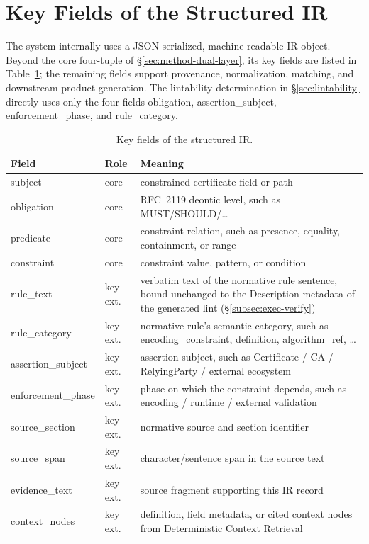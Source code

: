 \section{Key Fields of the Structured IR}
\label{app:ir}

The system internally uses a JSON-serialized, machine-readable IR object.
Beyond the core four-tuple of \S\ref{sec:method-dual-layer}, its key fields are listed in Table~\ref{tab:irfields};
the remaining fields support provenance, normalization, matching, and downstream
product generation. The lintability determination in \S\ref{sec:lintability} directly
uses only the four fields obligation, assertion\_subject, enforcement\_phase, and
rule\_category.

\begin{table}[tb]
\centering
\footnotesize
\caption{Key fields of the structured IR.}
\label{tab:irfields}
\begin{tabularx}{\columnwidth}{@{}l l X@{}}
\toprule
Field & Role & Meaning \\
\midrule
subject & core & constrained certificate field or path \\
obligation & core & RFC~2119 deontic level, such as MUST/SHOULD/\dots \\
predicate & core & constraint relation, such as presence, equality,
  containment, or range \\
constraint & core & constraint value, pattern, or condition \\
rule\_text & key ext. & verbatim text of the normative rule sentence, bound
  unchanged to the Description metadata of the generated lint
  (\S\ref{subsec:exec-verify}) \\
rule\_category & key ext. & normative rule's semantic category, such as
  encoding\_constraint, definition, algorithm\_ref, \dots \\
assertion\_subject & key ext. & assertion subject, such as Certificate / CA /
  RelyingParty / external ecosystem \\
enforcement\_phase & key ext. & phase on which the constraint depends,
  such as encoding / runtime / external validation \\
source\_section & key ext. & normative source and section
  identifier \\
source\_span & key ext. & character/sentence span in the source text \\
evidence\_text & key ext. & source fragment supporting this IR record \\
context\_nodes & key ext. & definition, field metadata, or cited
  context nodes from Deterministic Context Retrieval \\
\bottomrule
\end{tabularx}
\end{table}

